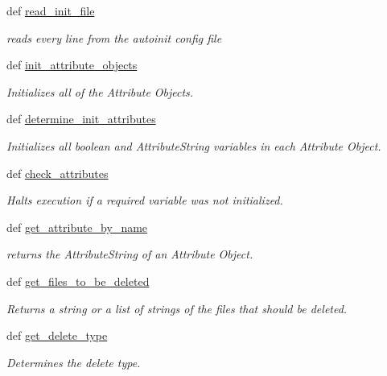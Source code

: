 \begin{DoxyCompactItemize}
\item 
def \hyperlink{classauto_1_1_auto_ac19425a1aa349fb6d62a3ba0ae21ca5d}{read\-\_\-init\-\_\-file}
\begin{DoxyCompactList}\small\item\em reads every line from the autoinit config file \end{DoxyCompactList}\item 
def \hyperlink{classauto_1_1_auto_a8b5f534b0a5f917786840666535e660b}{init\-\_\-attribute\-\_\-objects}
\begin{DoxyCompactList}\small\item\em Initializes all of the Attribute Objects. \end{DoxyCompactList}\item 
def \hyperlink{classauto_1_1_auto_a4f7bcdeb1ac83b4f413f6dde2157cbd1}{determine\-\_\-init\-\_\-attributes}
\begin{DoxyCompactList}\small\item\em Initializes all boolean and Attribute\-String variables in each Attribute Object. \end{DoxyCompactList}\item 
def \hyperlink{classauto_1_1_auto_a89cb3988b0930bd365ba0c28ec7ae717}{check\-\_\-attributes}
\begin{DoxyCompactList}\small\item\em Halts execution if a required variable was not initialized. \end{DoxyCompactList}\item 
def \hyperlink{classauto_1_1_auto_a9f4204698d1c1546e3a6543ef5f0f9df}{get\-\_\-attribute\-\_\-by\-\_\-name}
\begin{DoxyCompactList}\small\item\em returns the Attribute\-String of an Attribute Object. \end{DoxyCompactList}\item 
def \hyperlink{classauto_1_1_auto_a9720be3f630bb419dc8714eec79ddfda}{get\-\_\-files\-\_\-to\-\_\-be\-\_\-deleted}
\begin{DoxyCompactList}\small\item\em Returns a string or a list of strings of the files that should be deleted. \end{DoxyCompactList}\item 
def \hyperlink{classauto_1_1_auto_aaee90e13177e3f2413c1738ec32963e0}{get\-\_\-delete\-\_\-type}
\begin{DoxyCompactList}\small\item\em Determines the delete type. \end{DoxyCompactList}\item 

\end{DoxyCompactItemize}
